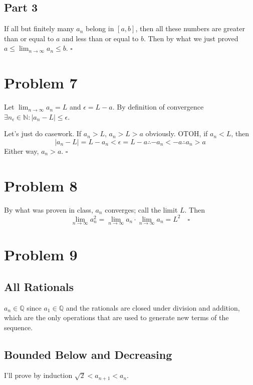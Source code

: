 \documentclass[12pt]{article}
\newcommand{\N}{\mathbb{N}}
\newcommand{\Q}{\mathbb{Q}}
\begin{document}
\subsection{Part 3}

If all but finitely many $a_n$ belong in $[a, b]$,
then all these numbers are greater than or equal to $a$
and less than or equal to $b$.
Then by what we just proved $a \le \lim_{n \to \infty} a_n \le b$. $\square$

\section{Problem 7}

Let $\lim_{n \to \infty} a_n=L$ and $\epsilon=L - a$.
By definition of convergence $\exists n_\epsilon \in \N: |a_n - L| \le \epsilon$.

Let's just do casework.
If $a_n > L$, $a_n > L > a$ obviously.
OTOH, if $a_n < L$, then
\[|a_n - L| = L - a_n < \epsilon = L - a \therefore -a_n < -a \therefore a_n > a\]
Either way, $a_n > a$. $\square$

\pagebreak

\section{Problem 8}

By what was proven in class, $a_n$ converges; call the limit $L$.
Then
\[\lim_{n \to \infty} a_n^2 = \lim_{n \to \infty} a_n \cdot \lim_{n \to \infty} a_n = L^2\quad\square\]

\section{Problem 9}

\subsection{All Rationals}

$a_n \in \Q$ since $a_1 \in \Q$ and the rationals are closed
under division and addition, which are the only operations
that are used to generate new terms of the sequence.

\subsection{Bounded Below and Decreasing}

I'll prove by induction $\sqrt{2} < a_{n+1} < a_n$.
\end{document}
